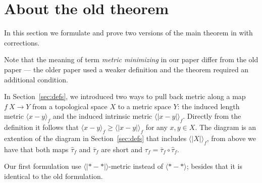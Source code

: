 \section{About the old theorem}\label{sec:old-thm}

In this section we formulate and prove two versions of the main theorem in \cite{petrunin-metric-min} with corrections.

Note that the meaning of term \emph{metric minimizing} in our paper differ from the old paper \cite{petrunin-metric-min} --- the older paper used a weaker definition and the theorem required an additional condition.

In Section~\ref{sec:defs}, we introduced two ways to pull back metric along a map $f\:X\to Y$ from a topological space $X$ to a metric space $Y$: the induced length metric
$\langle x-y\rangle_f$ and the induced intrinsic metric $\langle| x-y|\rangle_f$.
Directly from the definition it follows that  $\langle x-y\rangle_f\ge \langle| x-y|\rangle_f$ for any $x,y\in X$.
The diagram is an extention of the diagram in Section~\ref{sec:defs} that includes $\langle|X|\rangle_f$, from above we have that both maps $\hat\tau_f$ and $\bar\tau_f$ are short and $\tau_f=\bar\tau_f\circ\hat\tau_f$.

\begin{figure}
\centering
{}
\end{figure}

Our first formulation use $\langle|{*}-{*}|\rangle$-metric instead of $\langle{*}-{*}\rangle$; besides that it is identical to the old formulation.

